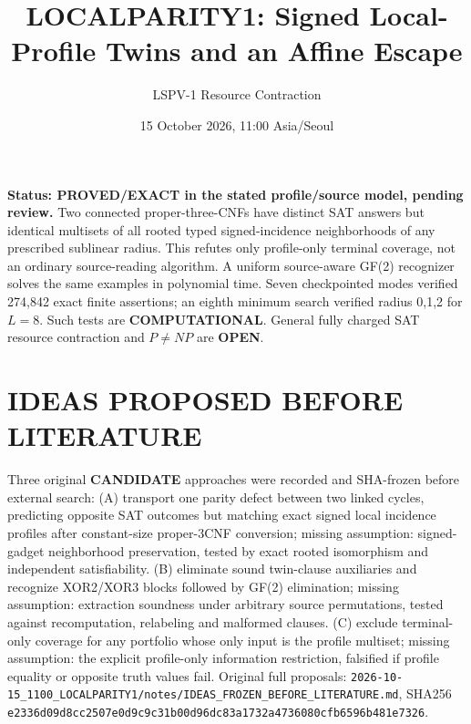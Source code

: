 \documentclass[11pt]{article}
\title{LOCALPARITY1: Signed Local-Profile Twins and an Affine Escape}
\author{LSPV-1 Resource Contraction}
\date{15 October 2026, 11:00 Asia/Seoul}
\begin{document}
\maketitle
\noindent\textbf{Status: PROVED/EXACT in the stated profile/source model, pending review.}
Two connected proper-three-CNFs have distinct SAT answers but identical multisets of all rooted typed signed-incidence neighborhoods of any prescribed sublinear radius. This refutes only profile-only terminal coverage, not an ordinary source-reading algorithm. A uniform source-aware GF(2) recognizer solves the same examples in polynomial time. Seven checkpointed modes verified 274,842 exact finite assertions; an eighth minimum search verified radius 0,1,2 for $L=8$. Such tests are \textbf{COMPUTATIONAL}. General fully charged SAT resource contraction and $P\ne NP$ are \textbf{OPEN}.

\section{IDEAS PROPOSED BEFORE LITERATURE}
Three original \textbf{CANDIDATE} approaches were recorded and SHA-frozen before external search: (A) transport one parity defect between two linked cycles, predicting opposite SAT outcomes but matching exact signed local incidence profiles after constant-size proper-3CNF conversion; missing assumption: signed-gadget neighborhood preservation, tested by exact rooted isomorphism and independent satisfiability. (B) eliminate sound twin-clause auxiliaries and recognize XOR2/XOR3 blocks followed by GF(2) elimination; missing assumption: extraction soundness under arbitrary source permutations, tested against recomputation, relabeling and malformed clauses. (C) exclude terminal-only coverage for any portfolio whose only input is the profile multiset; missing assumption: the explicit profile-only information restriction, falsified if profile equality or opposite truth values fail. Original full proposals: \texttt{2026-10-15\_1100\_LOCALPARITY1/notes/IDEAS\_FROZEN\_BEFORE\_LITERATURE.md}, SHA256 \texttt{e2336d09d8cc2507e0d9c9c31b00d96dc83a1732a4736080cfb6596b481e7326}.
\end{document}
